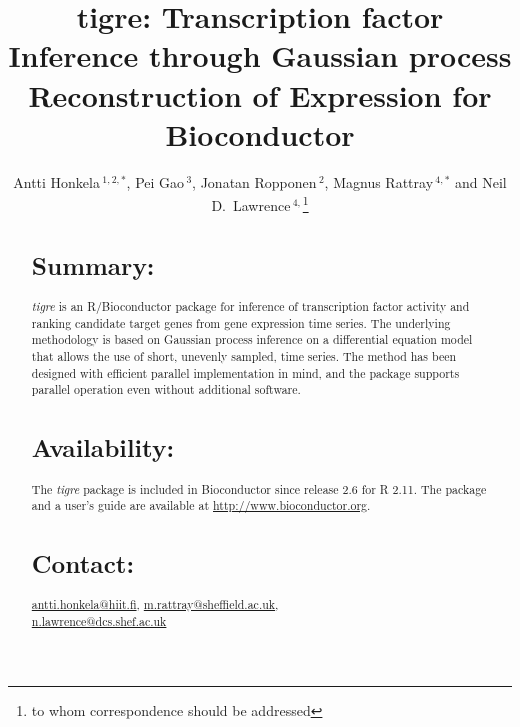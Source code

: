 \documentclass{bioinfo}
\newcommand{\tigre}{\emph{tigre}}
\begin{document}

\title[tigre]{tigre: Transcription factor Inference through Gaussian process Reconstruction of Expression for Bioconductor}
\author[Honkela \textit{et~al.}]{Antti Honkela\,$^{1,2,*}$, Pei Gao\,$^{3}$, Jonatan Ropponen\,$^{2}$, Magnus Rattray\,$^{4,*}$ and Neil D.\ Lawrence\,$^{4,}$\footnote{to whom correspondence should be addressed}}
\address{$^{1}$Helsinki Institute for Information Technology HIIT,
  University of Helsinki, Helsinki, Finland\\
  $^{2}$Department of Information and Computer Science, Aalto
  University, Helsinki, Finland\\
  $^{3}$Department of Public Health and Primary Care, University of
  Cambridge, Cambridge, UK\\
  $^{4}$Sheffield Institute for Translational Neuroscience and
  Department of Computer Science, University of Sheffield, Sheffield, UK}



\maketitle

\begin{abstract}

\section{Summary:}
\tigre{} is an R/Bioconductor package for inference of transcription
factor activity and ranking candidate target genes from gene
expression time series.  The underlying methodology is based on
Gaussian process inference on a differential equation model that
allows the use of short, unevenly sampled, time series.  The method has been
designed with efficient parallel implementation in mind, and the
package supports parallel operation even without additional
software.

\section{Availability:}
The \tigre{} package is included in Bioconductor since release 2.6 for
R 2.11. The package and a user's guide are available at
\href{http://www.bioconductor.org}{http://www.bioconductor.org}.

\section{Contact:} \href{antti.honkela@hiit.fi}{antti.honkela@hiit.fi},
\href{m.rattray@sheffield.ac.uk}{m.rattray@sheffield.ac.uk},\\
\href{n.lawrence@dcs.shef.ac.uk}{n.lawrence@dcs.shef.ac.uk}
\end{abstract}
\end{document}
